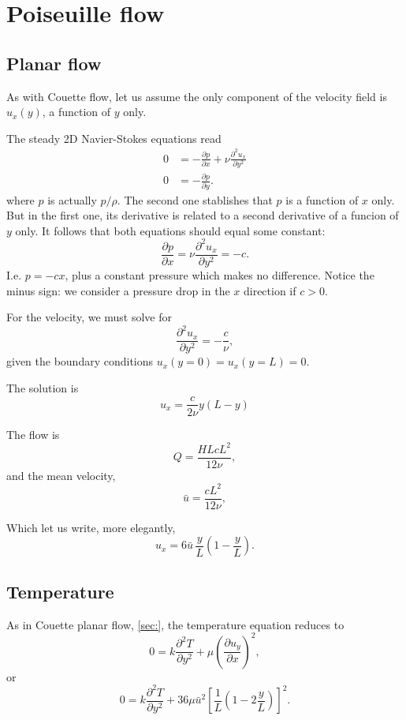 \section{Poiseuille flow}

\subsection{Planar flow}

As with Couette flow, let us assume the only component
of the velocity field is $u_x(y)$, a function of $y$ only.

The steady 2D Navier-Stokes equations read
\begin{align}
  0 & =   - \frac{\partial p}{\partial x} +
  \nu
  \frac{\partial^2 u_x}{\partial y^2}
   \\
  0 &=   - \frac{\partial p}{\partial y} .
\end{align}
where $p$ is actually $p/\rho$. The second one stablishes that $p$ is
a function of $x$ only. But in the first one, its derivative is
related to a second derivative of a funcion of $y$ only. It follows
that both equations should equal some constant:
\[
\frac{\partial p}{\partial x} =
 \nu
  \frac{\partial^2 u_x}{\partial y^2} = -c .
\]
I.e. $p= - c x$, plus a constant pressure which makes no
difference. Notice the minus sign: we consider a pressure drop in
the $x$ direction if $c > 0$.

For the velocity, we must solve for
\[
  \frac{\partial^2 u_x}{\partial y^2} = -\frac{c}{\nu} ,
\]
given the boundary conditions $u_x(y=0)=u_x(y=L)=0$.

The solution is
\[
u_x=\frac{c}{2\nu} y (L-y)
\]

The flow is
\[
Q= \frac{HL c L^2}{12\nu} ,
\]
and the mean velocity,
\[
\bar{u}= \frac{c L^2}{12\nu} ,
\]

Which let us write, more elegantly,
\[
u_x=6 \bar{u} \,  \frac{y}{L} \left( 1- \frac{y}{L}\right). 
\]


\subsection{Temperature}

As in Couette planar flow, \ref{sec:}, the temperature equation
reduces to
\[
0 =  k \frac{\partial^2 T}{\partial y^2} +
\mu  \left( \frac{\partial u_y}{\partial x} \right)^2,
\]
or
\[
0 =  k \frac{\partial^2 T}{\partial y^2} +
36 \mu \bar{u}^2 \left[
  \frac{1}{L} \left( 1- 2 \frac{y}{L}  \right)
  \right]^2 .
\]

